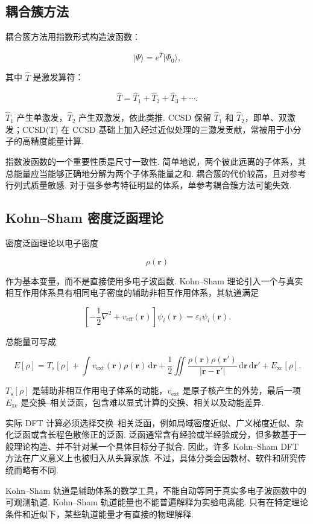 \documentclass[UTF8,11pt,a4paper,openany]{ctexbook}
\newcommand{\ket}[1]{\lvert #1\rangle}\newcommand{\bra}[1]{\langle #1\rvert}
\newcommand{\dd}{\,\mathrm d}\newcommand{\Ham}{\hat H}\newcommand{\tr}{\operatorname{Tr}}
\begin{document}
\subsection{耦合簇方法}

耦合簇方法用指数形式构造波函数：

\[
\ket{\Psi}=e^{\hat T}\ket{\Phi_0},
\]

其中 $\hat T$ 是激发算符：

\[
\hat T=\hat T_1+\hat T_2+\hat T_3+\cdots.
\]

$\hat T_1$ 产生单激发，$\hat T_2$ 产生双激发，依此类推. CCSD 保留 $\hat T_1$ 和 $\hat T_2$，即单、双激发；CCSD(T) 在 CCSD 基础上加入经过近似处理的三激发贡献，常被用于小分子的高精度能量计算. 

指数波函数的一个重要性质是尺寸一致性. 简单地说，两个彼此远离的子体系，其总能量应当能够正确地分解为两个子体系能量之和. 耦合簇的代价较高，且对参考行列式质量敏感. 对于强多参考特征明显的体系，单参考耦合簇方法可能失效. 

\subsection{Kohn--Sham 密度泛函理论}

密度泛函理论以电子密度

\[
\rho(\mathbf r)
\]

作为基本变量，而不是直接使用多电子波函数. Kohn--Sham 理论引入一个与真实相互作用体系具有相同电子密度的辅助非相互作用体系，其轨道满足

\[
\left[
-\frac{1}{2}\nabla^2
+v_{\mathrm{eff}}(\mathbf r)
\right]\psi_i(\mathbf r)
=
\varepsilon_i\psi_i(\mathbf r).
\]

总能量可写成

\[
E[\rho]
=
T_s[\rho]
+\int v_{\mathrm{ext}}(\mathbf r)\rho(\mathbf r)\dd\mathbf r
+\frac{1}{2}\iint
\frac{\rho(\mathbf r)\rho(\mathbf r')}
{|\mathbf r-\mathbf r'|}
\dd\mathbf r\dd\mathbf r'
+E_{\mathrm{xc}}[\rho].
\]

$T_s[\rho]$ 是辅助非相互作用电子体系的动能，$v_{\mathrm{ext}}$ 是原子核产生的外势，最后一项 $E_{\mathrm{xc}}$ 是交换--相关泛函，包含难以显式计算的交换、相关以及动能差异. 

实际 DFT 计算必须选择交换--相关泛函，例如局域密度近似、广义梯度近似、杂化泛函或含长程色散修正的泛函. 泛函通常含有经验或半经验成分，但多数基于一般理论构造、并不针对某一个具体目标分子拟合. 因此，许多 Kohn--Sham DFT 方法在广义意义上也被归入从头算家族. 不过，具体分类会因教材、软件和研究传统而略有不同. 

\begin{limitbox}
Kohn--Sham 轨道是辅助体系的数学工具，不能自动等同于真实多电子波函数中的可观测轨道. Kohn--Sham 轨道能量也不能普遍解释为实验电离能. 只有在特定理论条件和近似下，某些轨道能量才有直接的物理解释. 
\end{limitbox}
\end{document}
